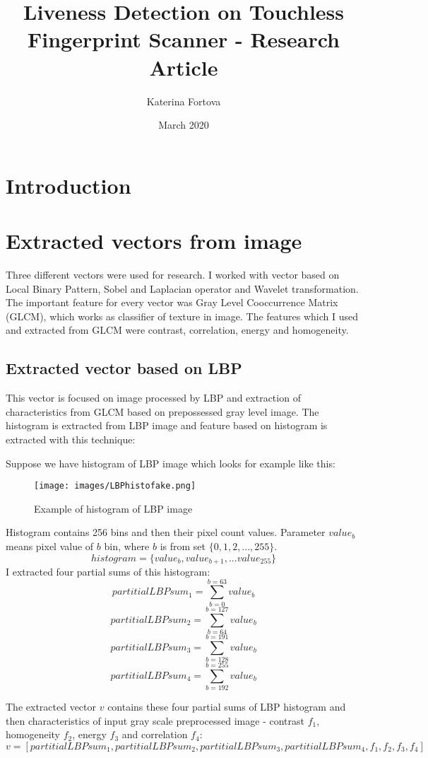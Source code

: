 \documentclass{article}
\title{Liveness Detection on Touchless Fingerprint Scanner - Research Article}
\author{Katerina Fortova}
\date{March 2020}
\begin{document}
\maketitle

\section{Introduction}

\section{Extracted vectors from image}
Three different vectors were used for research. I worked with vector based on Local Binary Pattern, Sobel and Laplacian operator and Wavelet transformation. The important feature for every vector was Gray Level Cooccurrence Matrix (GLCM), which works as classifier of texture in image. The features which I used and extracted from GLCM were contrast, correlation, energy and homogeneity. 

\subsection{Extracted vector based on LBP}
This vector is focused on image processed by LBP and extraction of characteristics from GLCM based on prepossessed gray level image. The histogram is extracted from LBP image and feature based on histogram is extracted with this technique:

Suppose we have histogram of LBP image which looks for example like this:
\begin{figure}[!htbp]
    \centering
    \texttt{[image: images/LBPhistofake.png]}
    \caption{Example of histogram of LBP image}
\end{figure}

Histogram contains 256 bins and then their pixel count values. Parameter $value_b$ means pixel value of $b$ bin, where $b$ is from set $\{0,1,2,...,255\}$.
$$histogram = \{value_b, value_{b+1}, ... value_{255}\}$$
I extracted four partial sums of this histogram:
$$partitialLBPsum_1 = \sum_{b=0}^{b=63} value_b $$
$$partitialLBPsum_2 = \sum_{b=64}^{b=127} value_b $$
$$partitialLBPsum_3 = \sum_{b=128}^{b=191} value_b $$
$$partitialLBPsum_4 = \sum_{b=192}^{b=255} value_b $$

The extracted vector $v$ contains these four partial sums of LBP histogram and then characteristics of input gray scale preprocessed image - contrast $f_1$, homogeneity $f_2$, energy $f_3$ and correlation $f_4$:
$$v = [partitialLBPsum_1, partitialLBPsum_2, partitialLBPsum_3, partitialLBPsum_4, f_1, f_2, f_3, f_4]$$
\end{document}
